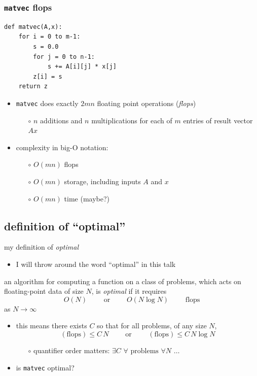 \documentclass[10pt,
               svgnames,
               hyperref={colorlinks,citecolor=DeepPink4,linkcolor=FireBrick,urlcolor=Maroon},
               usepdftitle=false]{beamer}
\newcommand{\ftt}[1]{{\color{blue} \texttt{#1}}}
\newcommand{\optimaldef}{
\begin{definition}
an algorithm for computing a function on a class of problems, which acts on floating-point data of size $N$, is \emph{optimal} if it requires
   $$O(N) \qquad \text{ or } \qquad O(N\log N) \qquad \text{ flops}$$
as $N\to\infty$
\end{definition}
}
\begin{document}
\begin{frame}[fragile]
\frametitle{\texttt{matvec} flops}
\begin{center}
\begin{minipage}{0.7\textwidth}
\begin{verbatim}
def matvec(A,x):
    for i = 0 to m-1:
        s = 0.0
        for j = 0 to n-1:
            s += A[i][j] * x[j]
        z[i] = s
    return z
\end{verbatim}
\end{minipage}
\end{center}

\bigskip
\begin{itemize}
\item \ftt{matvec} does exactly $2mn$ floating point operations (\emph{flops})
    \begin{itemize}
    \item[$\circ$] $n$ additions and $n$ multiplications for each of $m$ entries of result vector $Ax$
    \end{itemize}
\item complexity in big-O notation:
    \begin{itemize}
    \item[$\circ$] $O(mn)$ flops
    \item[$\circ$] $O(mn)$ storage, including inputs $A$ and $x$
    \item[$\circ$] $O(mn)$ time (maybe?)
    \end{itemize}
\end{itemize}
\end{frame}


\subsection{definition of ``optimal''}

\begin{frame}{my definition of \emph{optimal}}

\begin{itemize}
\item I will throw around the word ``optimal'' in this talk
\end{itemize}

\optimaldef

\begin{itemize}
\item this means there exists $C$ so that for all problems, of any size $N$,
   $$(\text{flops}) \le C\, N \qquad \text{ or } \qquad (\text{flops}) \le C\, N\log N$$

    \begin{itemize}
    \item[$\circ$] quantifier order matters: \quad $\exists C \,\, \forall \text{ problems} \,\, \forall N \,\,  \dots$
    \end{itemize}
\item is \ftt{matvec} optimal?
\end{itemize}
\end{frame}
\end{document}
